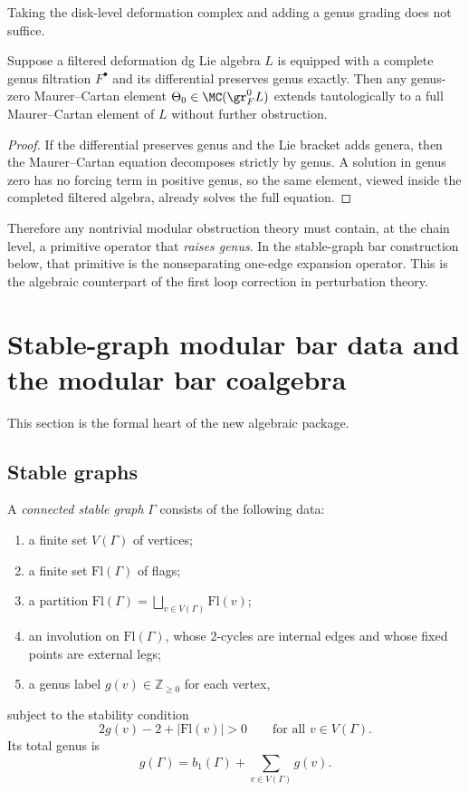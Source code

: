 Taking the disk-level deformation complex and adding a genus grading does not suffice.

\begin{proposition}
Suppose a filtered deformation dg Lie algebra $L$ is equipped with a complete genus
filtration $F^\bullet$ and its differential preserves genus exactly. Then any genus-zero
Maurer--Cartan element $\Theta_0\in \MC(\gr_F^0 L)$ extends tautologically to a full
Maurer--Cartan element of $L$ without further obstruction.
\end{proposition}

\begin{proof}
If the differential preserves genus and the Lie bracket adds genera, then the Maurer--Cartan
equation decomposes strictly by genus. A solution in genus zero has no forcing term in
positive genus, so the same element, viewed inside the completed filtered algebra, already
solves the full equation.
\end{proof}

\begin{remark}
Therefore any nontrivial modular obstruction theory must contain, at the chain level,
a primitive operator that \emph{raises genus}. In the stable-graph bar construction below,
that primitive is the nonseparating one-edge expansion operator. This is the algebraic
counterpart of the first loop correction in perturbation theory.
\end{remark}

\section{Stable-graph modular bar data and the modular bar coalgebra}

This section is the formal heart of the new algebraic package.

\subsection{Stable graphs}

\begin{definition}
A \emph{connected stable graph} $\Gamma$ consists of the following data:
\begin{enumerate}[leftmargin=2.4em]
\item a finite set $V(\Gamma)$ of vertices;
\item a finite set $\mathrm{Fl}(\Gamma)$ of flags;
\item a partition $\mathrm{Fl}(\Gamma)=\bigsqcup_{v\in V(\Gamma)}\mathrm{Fl}(v)$;
\item an involution on $\mathrm{Fl}(\Gamma)$, whose $2$-cycles are internal edges and
whose fixed points are external legs;
\item a genus label $g(v)\in \mathbb Z_{\ge 0}$ for each vertex,
\end{enumerate}
subject to the stability condition
\[
2g(v)-2+|\mathrm{Fl}(v)|>0
\qquad\text{for all }v\in V(\Gamma).
\]
Its total genus is
\[
g(\Gamma)=b_1(\Gamma)+\sum_{v\in V(\Gamma)}g(v).
\]
\end{definition}

